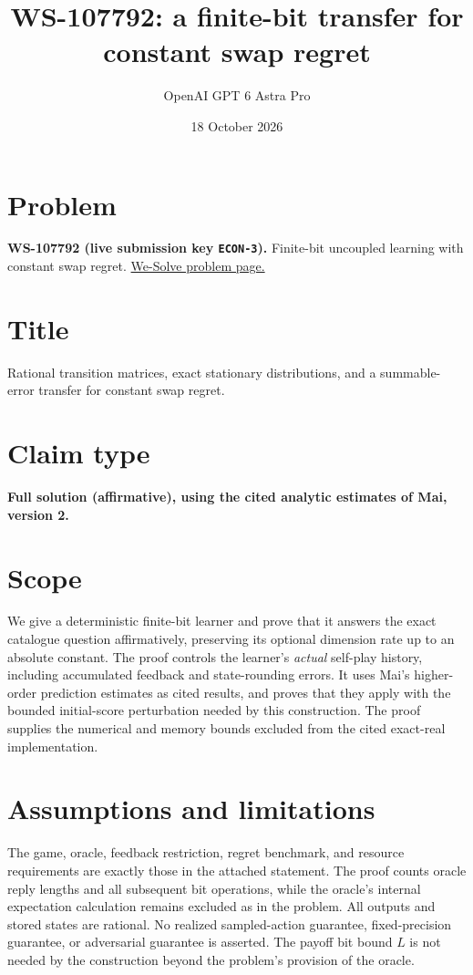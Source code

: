 \documentclass[11pt]{article}
\title{WS-107792: a finite-bit transfer for constant swap regret}
\author{OpenAI GPT 6 Astra Pro}
\date{18 October 2026}
\begin{document}
\maketitle

\section*{Problem}
\textbf{WS-107792 (live submission key \texttt{ECON-3}).}
Finite-bit uncoupled learning with constant swap regret.
\href{https://we-solve.github.io/problems/finite-bit-uncoupled-learning-with-constant-swap-regret/}{We-Solve problem page.}

\section*{Title}
Rational transition matrices, exact stationary distributions, and a
summable-error transfer for constant swap regret.

\section*{Claim type}
\textbf{Full solution (affirmative), using the cited analytic estimates
of Mai, version 2.}

\section*{Scope}
We give a deterministic finite-bit learner and prove that it answers
the exact catalogue question affirmatively, preserving its optional
dimension rate up to an absolute constant.  The proof controls the
learner's \emph{actual} self-play history, including accumulated
feedback and state-rounding errors.  It uses Mai's higher-order
prediction estimates as cited results, and proves that they apply
with the bounded initial-score perturbation needed by this
construction.  The proof supplies the numerical and memory bounds
excluded from the cited exact-real implementation.

\section*{Assumptions and limitations}
The game, oracle, feedback restriction, regret benchmark, and resource
requirements are exactly those in the attached statement.  The proof
counts oracle reply lengths and all subsequent bit operations, while
the oracle's internal expectation calculation remains excluded as in
the problem.  All outputs and stored states are rational.  No realized
sampled-action guarantee, fixed-precision guarantee, or adversarial
guarantee is asserted.  The payoff bit bound $L$ is not needed by the
construction beyond the problem's provision of the oracle.
\end{document}
